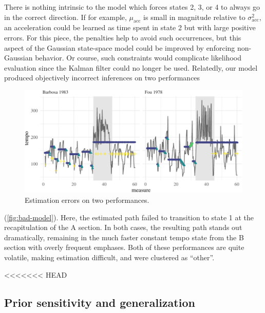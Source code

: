 \documentclass[aoas]{imsart}
\begin{document}
There is nothing intrinsic to the model which forces states 2,
3, or 4 to always go in the correct direction. If for example,
$\mu_{\textrm{acc}}$ is small in magnitude relative to
$\sigma^2_{\textrm{acc}}$, an acceleration could be learned as time
spent in state 2 but with large positive errors. For this piece, the
penalties help to avoid such occurrences, but this aspect of the
Gaussian state-space model could be improved by enforcing non-Gaussian
behavior. Or course, such constraints would complicate likelihood
evaluation since the Kalman filter could no longer be used. Relatedly,
our model produced objectively incorrect inferences on two performances
\begin{figure}[t]
  \centering
  \includegraphics[width=.9\linewidth]{bad-model-1}
  \caption{Estimation errors on two performances.}
  \label{fig:bad-model}
\end{figure}
(\autoref{fig:bad-model}). Here, the estimated
path failed to transition to state 1 at the
recapitulation of the A section. In both cases, the resulting path
stands out dramatically, remaining in the much faster constant tempo
state from the B section with overly frequent emphases. Both of these
performances are quite volatile, making estimation difficult, and were clustered as ``other''. 

<<<<<<< HEAD

\subsection{Prior sensitivity and generalization}
\end{document}
